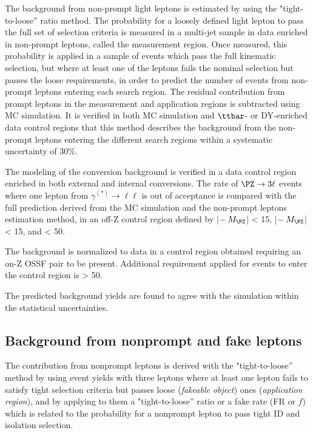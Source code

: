 The background from non-prompt light leptons is estimated by using the "tight-to-loose'' ratio method. 
The probability for a loosely defined light lepton to pass the full set of selection criteria is measured in a multi-jet sample in data enriched in non-prompt leptons, called the measurement region. 
Once measured, this probability is applied in a sample of events which pass the full kinematic selection, but where at least one of the leptons fails the nominal selection but passes the loose requirements, 
in order to predict the number of events from non-prompt leptons entering each search region. 
The residual contribution from prompt leptons in the measurement and application regions is subtracted using MC simulation. 
It is verified in both MC simulation and $\ttbar$- or DY-enriched data control regions that this method describes the background from the non-prompt leptons entering the different search regions within 
a systematic uncertainty of 30\%. 
 
The modeling of the conversion background is verified in a data control region enriched in both external and internal conversions. 
The rate of $\PZ \to 3\ell$ events where one lepton from $\gamma^{(*)}\to\ell\ell$ is out of acceptance is compared with 
the full prediction derived from the MC simulation and the non-prompt leptons estimation method, in an off-Z control region 
defined by |\Mll $- \:M_\PZ$| < 15\GeV, |\mlll $- \:M_\PZ$| < 15\GeV,
and \ptmiss < 50\GeV. 

The \WZ background is normalized to data in a control region obtained 
requiring an on-Z OSSF pair to be present. Additional requirement applied 
for events to enter the control region is \ptmiss > 50\GeV.

The predicted background yields are found to agree with the simulation
within the statistical uncertainties. 


\subsection{Background from nonprompt and fake leptons}\label{sec:tight_loose_method}

The contribution from nonprompt leptons is derived with the "tight-to-loose'' method
by using event yields with three leptons where at least one lepton fails to satisfy tight
selection criteria but passes loose (\emph{fakeable object}) ones (\emph{application region}), 
and by applying to them  a "tight-to-loose'' ratio or a fake rate (FR or $f$) which is related to the probability for 
a nonprompt lepton to pass tight ID and isolation selection.

